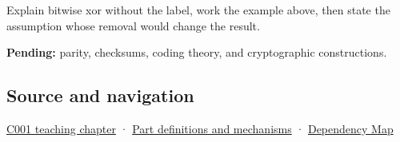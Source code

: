 Explain bitwise xor without the label, work the example above, then state the assumption whose removal would change the result.

\textbf{Pending:} parity, checksums, coding theory, and cryptographic constructions.

\subsection{Source and navigation}\label{appendix-d49161831368-source-and-navigation}

\hyperref[01-foundations-i-ch001-from-a-signal-to-an-interpretation]{C001 teaching chapter} · \hyperref[appendix-fd090d982a15]{Part definitions and mechanisms} · \hyperref[appendix-4ad47bdd269a]{Dependency Map}
